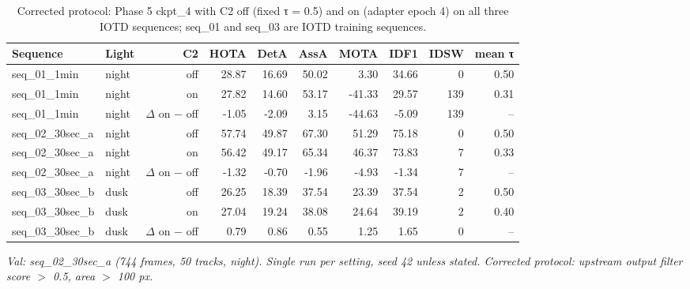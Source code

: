 \begin{table}[t]
\centering
\small
\caption{Corrected protocol: Phase 5 ckpt\_4 with C2 off (fixed τ = 0.5) and on (adapter epoch 4) on all three IOTD sequences; seq\_01 and seq\_03 are IOTD training sequences.}
\begin{tabular}{llrrrrrrrr}
\toprule
Sequence & Light & C2 & HOTA & DetA & AssA & MOTA & IDF1 & IDSW & mean τ \\
\midrule
seq\_01\_1min & night & off & 28.87 & 16.69 & 50.02 & 3.30 & 34.66 & 0 & 0.50 \\
seq\_01\_1min & night & on & 27.82 & 14.60 & 53.17 & -41.33 & 29.57 & 139 & 0.31 \\
seq\_01\_1min & night & $\Delta$ on − off & -1.05 & -2.09 & 3.15 & -44.63 & -5.09 & 139 & -- \\
seq\_02\_30sec\_a & night & off & 57.74 & 49.87 & 67.30 & 51.29 & 75.18 & 0 & 0.50 \\
seq\_02\_30sec\_a & night & on & 56.42 & 49.17 & 65.34 & 46.37 & 73.83 & 7 & 0.33 \\
seq\_02\_30sec\_a & night & $\Delta$ on − off & -1.32 & -0.70 & -1.96 & -4.93 & -1.34 & 7 & -- \\
seq\_03\_30sec\_b & dusk & off & 26.25 & 18.39 & 37.54 & 23.39 & 37.54 & 2 & 0.50 \\
seq\_03\_30sec\_b & dusk & on & 27.04 & 19.24 & 38.08 & 24.64 & 39.19 & 2 & 0.40 \\
seq\_03\_30sec\_b & dusk & $\Delta$ on − off & 0.79 & 0.86 & 0.55 & 1.25 & 1.65 & 0 & -- \\
\bottomrule
\end{tabular}
\par\smallskip\footnotesize\emph{Val: seq\_02\_30sec\_a (744 frames, 50 tracks, night). Single run per setting, seed 42 unless stated. Corrected protocol: upstream output filter score $>$ 0.5, area $>$ 100 px.}
\end{table}
